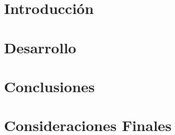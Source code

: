 \documentclass{extbook}
\begin{document}

\tableofcontents
\listoffigures
\chapter{Introducción}

\chapter{Desarrollo}

\chapter{Conclusiones}

\chapter{Consideraciones Finales}

\end{document}
